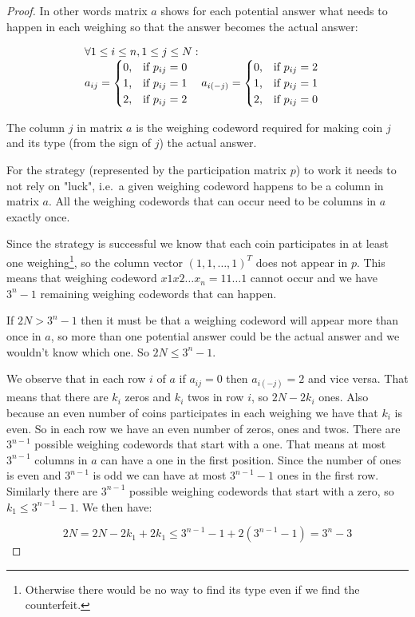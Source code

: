 \begin{proof}
In other words matrix $a$ shows for each potential answer what needs to happen in each weighing so that the answer becomes the actual answer:

$$
\begin{array}{l}
\forall 1 \leq i \leq n, 1 \leq j \leq N: \\
a_{ij} = 
\begin{cases}
0  \text{,\quad if } p_{ij} = 0\\
1  \text{,\quad if } p_{ij} = 1\\
2  \text{,\quad if } p_{ij} = 2
\end{cases}
a_{i(-j)} = 
\begin{cases}
0  \text{,\quad if } p_{ij} = 2\\
1  \text{,\quad if } p_{ij} = 1\\
2  \text{,\quad if } p_{ij} = 0
\end{cases}
\end{array}
$$

The column $j$ in matrix $a$ is the weighing codeword required for making coin $j$ and its type (from the sign of $j$) the actual answer.

For the strategy (represented by the participation matrix $p$) to work it needs to not rely on "luck", i.e.\ a given weighing codeword happens to be a column in matrix $a$. All the weighing codewords that can occur need to be columns in $a$ exactly once. 

Since the strategy is successful we know that each coin participates in at least one weighing\footnote{Otherwise there would be no way to find its type even if we find the counterfeit.}, so the column vector $(1, 1, \ldots, 1)^T$ does not appear in $p$. This means that weighing codeword $x1 x2 \ldots x_n=11\ldots1$ cannot occur and we have $3^n - 1$ remaining weighing codewords that can happen.

If $2 N > 3^n - 1$ then it must be that a weighing codeword will appear more than once in $a$, so more than one potential answer could be the actual answer and we wouldn't know which one. So $2 N \leq 3^n - 1$.

We observe that in each row $i$ of $a$ if $a_{ij}=0$ then $a_{i(-j)}=2$ and vice versa. That means that there are $k_i$ zeros and $k_i$ twos in row $i$, so $2 N - 2 k_i$ ones. Also because an even number of coins participates in each weighing we have that $k_i$ is even. So in each row we have an even number of zeros, ones and twos. There are $3^{n - 1}$ possible weighing codewords that start with a one. That means at most $3^{n-1}$ columns in $a$ can have a one in the first position. Since the number of ones is even and $3^{n-1}$ is odd we can have at most $3^{n-1}-1$ ones in the first row. Similarly there are $3^{n - 1}$ possible weighing codewords that start with a zero, so $k_1 \leq 3^{n-1} - 1$. We then have:

$$
2N = 2N - 2 k_1 + 2 k_1 \leq 3^{n-1} - 1 + 2 (3^{n-1} - 1) = 3^n - 3    
$$
\end{proof}






